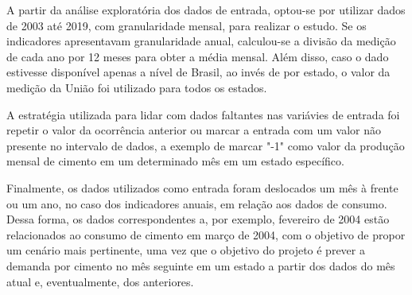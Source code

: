     A partir da análise exploratória dos dados de entrada, optou-se por utilizar dados de 2003 até 2019, com granularidade mensal, para realizar o estudo. Se os indicadores apresentavam granularidade anual, calculou-se a divisão da medição de cada ano por 12 meses para obter a média mensal. Além disso, caso o dado estivesse disponível apenas a nível de Brasil, ao invés de por estado, o valor da medição da União foi utilizado para todos os estados.
    
    
    A estratégia utilizada para lidar com dados faltantes nas variávies de entrada foi repetir o valor da ocorrência anterior ou marcar a entrada com um valor não presente no intervalo de dados, a exemplo de marcar "-1" como valor da produção mensal de cimento em um determinado mês em um estado específico.


    Finalmente, os dados utilizados como entrada foram deslocados um mês à frente ou um ano, no caso dos indicadores anuais, em relação aos dados de consumo. Dessa forma, os dados correspondentes a, por exemplo, fevereiro de 2004 estão relacionados ao consumo de cimento em março de 2004, com o objetivo de propor um cenário mais pertinente, uma vez que o objetivo do projeto é prever a demanda por cimento no mês seguinte em um estado a partir dos dados do mês atual e, eventualmente, dos anteriores.
